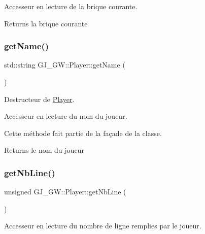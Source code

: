 Accesseur en lecture de la brique courante. 

\begin{DoxyReturn}{Returns}
la brique courante 
\end{DoxyReturn}
\hypertarget{class_g_j___g_w_1_1_player_a70b2063f40837677855bc71338f24ead}{}\label{class_g_j___g_w_1_1_player_a70b2063f40837677855bc71338f24ead} 
\subsubsection{\texorpdfstring{get\+Name()}{getName()}}
{\footnotesize\ttfamily std\+::string G\+J\+\_\+\+G\+W\+::\+Player\+::get\+Name (\begin{DoxyParamCaption}{ }\end{DoxyParamCaption})\hspace{0.3cm}{\ttfamily [inline]}}



Destructeur de \hyperlink{class_g_j___g_w_1_1_player}{Player}. 

Accesseur en lecture du nom du joueur.

Cette méthode fait partie de la façade de la classe.

\begin{DoxyReturn}{Returns}
le nom du joueur 
\end{DoxyReturn}
\hypertarget{class_g_j___g_w_1_1_player_a550e0d4addf830677873b028a8e4f5ed}{}\label{class_g_j___g_w_1_1_player_a550e0d4addf830677873b028a8e4f5ed} 
\subsubsection{\texorpdfstring{get\+Nb\+Line()}{getNbLine()}}
{\footnotesize\ttfamily unsigned G\+J\+\_\+\+G\+W\+::\+Player\+::get\+Nb\+Line (\begin{DoxyParamCaption}{ }\end{DoxyParamCaption})\hspace{0.3cm}{\ttfamily [inline]}}



Accesseur en lecture du nombre de ligne remplies par le joueur. 

